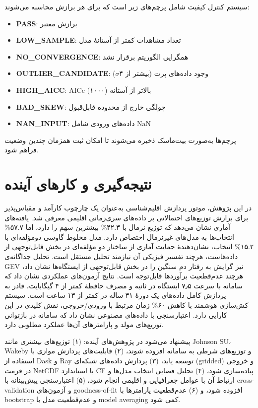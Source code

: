 \documentclass[12pt,a4paper,twocolumn]{article}
\begin{document}
سیستم کنترل کیفیت شامل پرچم‌های زیر است که برای هر برازش محاسبه می‌شوند:
\begin{itemize}
\item \textbf{PASS}: برازش معتبر
\item \textbf{LOW\_SAMPLE}: تعداد مشاهدات کمتر از آستانهٔ مدل
\item \textbf{NO\_CONVERGENCE}: همگرایی الگوریتم برقرار نشد
\item \textbf{OUTLIER\_CANDIDATE}: وجود داده‌های پرت (بیشتر از ۴$\sigma$)
\item \textbf{HIGH\_AICC}: AICc بالاتر از آستانه (۱۰۰۰)
\item \textbf{BAD\_SKEW}: چولگی خارج از محدوده قابل‌قبول
\item \textbf{NAN\_INPUT}: داده‌های ورودی شامل NaN
\end{itemize}
پرچم‌ها به‌صورت بیت‌ماسک ذخیره می‌شوند تا امکان ثبت همزمان چندین وضعیت فراهم شود.

\section{نتیجه‌گیری و کارهای آینده}

در این پژوهش، موتور پردازش اقلیم‌شناسی به‌عنوان یک چارچوب کارآمد و مقیاس‌پذیر برای برازش توزیع‌های احتمالاتی بر داده‌های سری‌زمانی اقلیمی معرفی شد. یافته‌های آماری نشان می‌دهد که توزیع نرمال با ۴۲.۳\% بیشترین سهم را دارد، اما ۵۷.۷\% انتخاب‌ها به مدل‌های غیرنرمال اختصاص دارد. مدل مخلوط گاوسی دومؤلفه‌ای با ۱۵.۲\% انتخاب، نشان‌دهندهٔ حمایت آماری از ساختار دو مؤلفه‌ای در بخش قابل‌توجهی از داده‌هاست، هرچند تفسیر فیزیکی آن نیازمند تحلیل مستقل است. تحلیل جداگانه‌ی GEV نیز گرایش به رفتار دم سنگین را در بخش قابل‌توجهی از ایستگاه‌ها نشان داد، هرچند عدم‌قطعیت برآوردها قابل‌توجه است. نتایج آزمون‌های عملکردی نشان داد که سامانه با سرعت ۷٫۵ ایستگاه در ثانیه و مصرف حافظهٔ کمتر از ۴ گیگابایت، قادر به پردازش کامل داده‌های یک دورهٔ ۳۱ ساله در کمتر از ۱۳ ساعت است. سیستم کش‌سازی هوشمند با کاهش ۶۰\% زمان مرتبط با ورودی/خروجی، نقش کلیدی در این کارایی دارد. اعتبارسنجی با داده‌های مصنوعی نشان داد که سامانه در بازتوانی توزیع‌های مولد و پارامترهای آن‌ها عملکرد مطلوبی دارد.

پیشنهاد می‌شود در پژوهش‌های آینده: (۱) توزیع‌های بیشتری مانند Johnson SU، Wakeby و توزیع‌های شرطی به سامانه افزوده شوند، (۲) قابلیت‌های پردازش موازی با استفاده از Dask و Ray توسعه یابد، (۳) پردازش داده‌های شبکه‌ای (gridded) و خروجی در فرمت NetCDF با استاندارد CF پیاده‌سازی شود، (۴) تحلیل فضایی انتخاب مدل‌ها و ارتباط آن با عوامل جغرافیایی و اقلیمی انجام شود، (۵) اعتبارسنجی پیش‌بینانه با cross-validation و آزمون‌های goodness-of-fit افزوده شود، و (۶) عدم‌قطعیت پارامترها با bootstrap و عدم‌قطعیت مدل با model averaging کمی شود.
\end{document}
